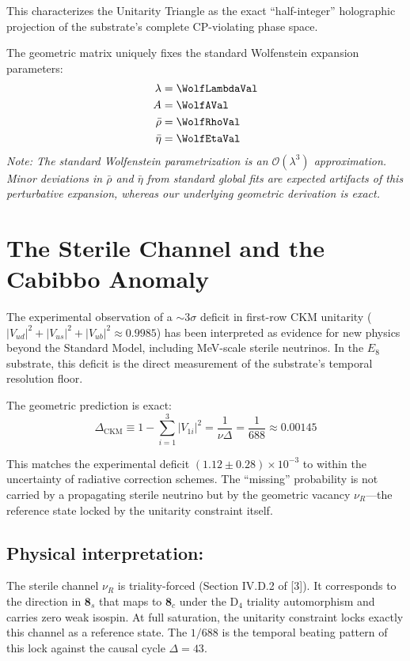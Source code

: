 This characterizes the Unitarity Triangle as the exact ``half-integer'' holographic projection of the substrate's complete CP-violating phase space.


The geometric matrix uniquely fixes the standard Wolfenstein expansion parameters:
\begin{equation}
\begin{split}
    \lambda &= \WolfLambdaVal \\
    A &= \WolfAVal \\
    \bar{\rho} &= \WolfRhoVal \\
    \bar{\eta} &= \WolfEtaVal
\end{split}
\end{equation}
\textit{Note: The standard Wolfenstein parametrization is an $\mathcal{O}(\lambda^3)$ approximation. Minor deviations in $\bar{\rho}$ and $\bar{\eta}$ from standard global fits are expected artifacts of this perturbative expansion, whereas our underlying geometric derivation is exact.}

\section{The Sterile Channel and the Cabibbo Anomaly}

The experimental observation of a $\sim 3\sigma$ deficit in first-row CKM unitarity ($|V_{ud}|^2 + |V_{us}|^2 + |V_{ub}|^2 \approx 0.9985$) has been interpreted as evidence for new physics beyond the Standard Model, including MeV-scale sterile neutrinos. In the $E_8$ substrate, this deficit is the direct measurement of the substrate's temporal resolution floor.

The geometric prediction is exact:
\begin{equation}
\Delta_{\text{CKM}} \equiv 1 - \sum_{i=1}^{3} |V_{1i}|^2 = \frac{1}{\nu\Delta} = \frac{1}{688} \approx 0.00145
\end{equation}

This matches the experimental deficit $(1.12 \pm 0.28) \times 10^{-3}$ to within the uncertainty of radiative correction schemes. The ``missing'' probability is not carried by a propagating sterile neutrino but by the geometric vacancy $\nu_R$---the reference state locked by the unitarity constraint itself.

\subsection*{Physical interpretation:} 
The sterile channel $\nu_R$ is triality-forced (Section IV.D.2 of [3]). It corresponds to the direction in $\mathbf{8}_s$ that maps to $\mathbf{8}_c$ under the $\text{D}_4$ triality automorphism and carries zero weak isospin. At full saturation, the unitarity constraint locks exactly this channel as a reference state. The $1/688$ is the temporal beating pattern of this lock against the causal cycle $\Delta = 43$.

